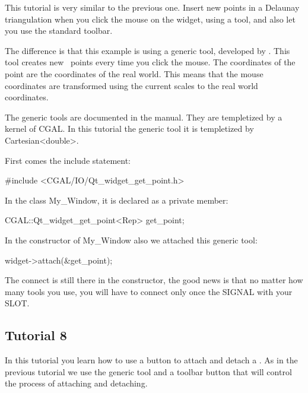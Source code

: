 This tutorial is very similar to the previous one. Insert new points
in a Delaunay triangulation when you click the mouse on the widget,
using a tool, and also let you use the standard toolbar.

The difference is that this example is using a generic tool, developed
by \cgal. This tool creates new \cgal\ points every time you click the
mouse. The coordinates of the point are the coordinates of the real
world. This means that the mouse coordinates are transformed using the
current scales to the real world coordinates.

The generic tools are documented in the manual. They are templetized
by a kernel of CGAL. In this tutorial the generic tool
 it is templetized by Cartesian<double>.

First comes the include statement:
\begin{ccExampleCode}
#include <CGAL/IO/Qt_widget_get_point.h>
\end{ccExampleCode}
In the class My\_Window, it is declared as a private member:
\begin{ccExampleCode}
CGAL::Qt_widget_get_point<Rep> get_point;
\end{ccExampleCode}
In the constructor of My\_Window also we attached this generic tool:
\begin{ccExampleCode}
widget->attach(&get_point);
\end{ccExampleCode}

The connect is still there in the constructor, the good news is that
no matter how many tools you use, you will have to connect only once
the SIGNAL with your SLOT.

\subsection*{Tutorial 8}

In this tutorial you learn how to use a button to attach and
detach a . As in the previous tutorial we use the
generic tool  and a toolbar button that will
control the process of attaching and detaching.


